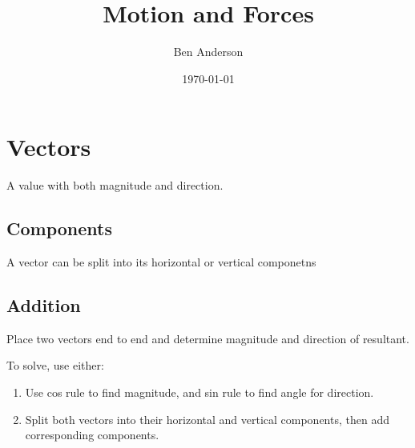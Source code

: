 \documentclass[a4paper,11pt]{article}
\begin{document}
\title{Motion and Forces}
\author{Ben Anderson}
\date{\today}
\maketitle
\pagebreak

\tableofcontents
\pagebreak


\section{Vectors}

A value with both magnitude and direction.


\subsection{Components}

A vector can be split into its horizontal or vertical componetns


\subsection{Addition}

Place two vectors end to end and determine magnitude and direction of
resultant.

To solve, use either:

\begin{enumerate}
\item Use cos rule to find magnitude, and sin rule to find angle for direction.
\item Split both vectors into their horizontal and vertical components, then
	add corresponding components.
\end{enumerate}
\end{document}
